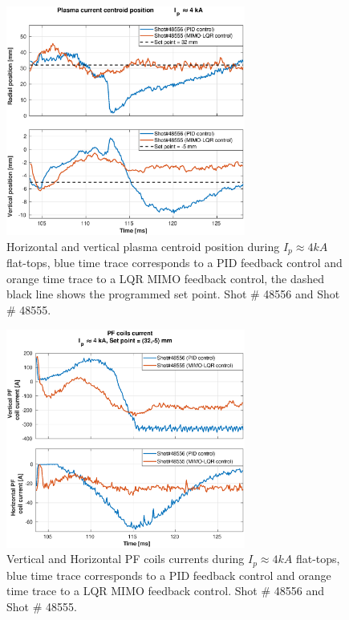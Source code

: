 \begin{figure}
	\centering
	\includegraphics[width=0.7\textwidth]{Chp5/PIDvsMIMO_556_555_2.eps}
	\caption{Horizontal and vertical plasma centroid position during  $I_p\approx 4kA$  flat-tops, blue time trace corresponds to a PID feedback control and orange time trace to a LQR MIMO feedback control, the dashed black line shows the programmed set point. Shot $\#$ 48556 and Shot $\#$ 48555.}
\end{figure}

\begin{figure}
	\centering
	\includegraphics[width=0.7\textwidth]{Chp5/PIDvsMIMO_556_555_curr_2.eps}
	\caption{  Vertical and Horizontal PF coils currents during  $I_p\approx 4kA$  flat-tops, blue time trace corresponds to a PID feedback control and orange time trace to a LQR MIMO feedback control.  Shot $\#$ 48556 and Shot $\#$ 48555.}
\end{figure}


